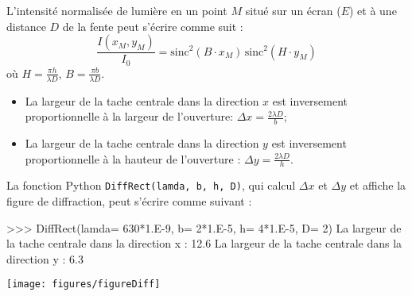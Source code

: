 \documentclass[a4paper,11pt]{article}
\theoremstyle{mytheor}
\begin{document}
L'intensité normalisée de lumière en un point $M$ situé sur un écran ($E$) et à une distance $D$ de la fente peut s'écrire comme suit :
\begin{equation}
\dfrac{I(x_{M}, y_{M})}{I_{0}} = \text{sinc}^{2}\left (B \cdot x_{M} \right)\,\text{sinc}^{2}  \left ( H \cdot y_{M} \right )
\label{Eq_1_3}
\end{equation}
%
où $H = \frac{\pi h}{\lambda D}$, $B = \frac{\pi b}{\lambda D}$.

\begin{itemize}
\item La largeur de la tache centrale dans la direction $x$ est inversement proportionnelle à la largeur de l'ouverture: $\Delta x = \frac{2 \lambda D}{b}$;
\item La largeur de la tache centrale dans la direction $y$ est inversement proportionnelle à la hauteur de l'ouverture : $\Delta y = \frac{2 \lambda D}{h}$.
\end{itemize}

La fonction Python \verb|DiffRect(lamda, b, h, D)|, qui calcul $\Delta x$ et $\Delta y$ et affiche la figure de diffraction, peut s'écrire comme suivant :

\newpage
\begin{pyshell}
>>> DiffRect(lamda= 630*1.E-9, b= 2*1.E-5, h= 4*1.E-5, D= 2)
La largeur de la tache centrale dans la direction x :  12.6
La largeur de la tache centrale dans la direction y :  6.3
\end{pyshell}
\begin{figure*}[th!]
\centering
\texttt{[image: figures/figureDiff]}
\end{figure*}
\end{document}
